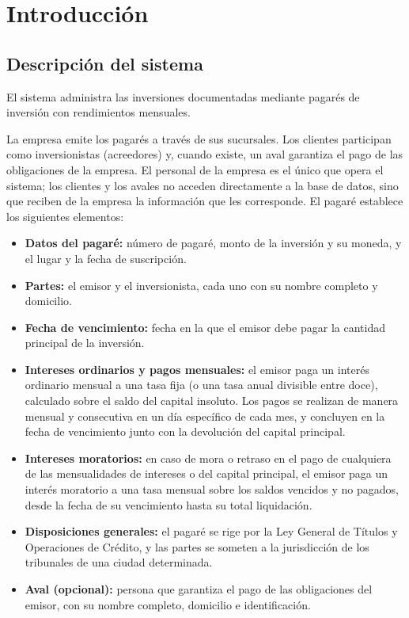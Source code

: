 \chapter{Introducci\'on}
\label{cap:introduccion}

\section{Descripci\'on del sistema}

El sistema administra las inversiones documentadas mediante pagar\'es de inversi\'on con rendimientos mensuales.

La empresa emite los pagar\'es a trav\'es de sus sucursales. Los clientes participan como inversionistas (acreedores) y, cuando existe, un aval garantiza el pago de las obligaciones de la empresa. El personal de la empresa es el \'unico que opera el sistema; los clientes y los avales no acceden directamente a la base de datos, sino que reciben de la empresa la informaci\'on que les corresponde. El pagar\'e establece los siguientes elementos:

\begin{itemize}[leftmargin=*]
	\item \textbf{Datos del pagar\'e:} n\'umero de pagar\'e, monto de la inversi\'on y su moneda, y el lugar y la fecha de suscripci\'on.
	\item \textbf{Partes:} el emisor y el inversionista, cada uno con su nombre completo y domicilio.
	\item \textbf{Fecha de vencimiento:} fecha en la que el emisor debe pagar la cantidad principal de la inversi\'on.
	\item \textbf{Intereses ordinarios y pagos mensuales:} el emisor paga un inter\'es ordinario mensual a una tasa fija (o una tasa anual divisible entre doce), calculado sobre el saldo del capital insoluto. Los pagos se realizan de manera mensual y consecutiva en un d\'ia espec\'ifico de cada mes, y concluyen en la fecha de vencimiento junto con la devoluci\'on del capital principal.
	\item \textbf{Intereses moratorios:} en caso de mora o retraso en el pago de cualquiera de las mensualidades de intereses o del capital principal, el emisor paga un inter\'es moratorio a una tasa mensual sobre los saldos vencidos y no pagados, desde la fecha de su vencimiento hasta su total liquidaci\'on.
	\item \textbf{Disposiciones generales:} el pagar\'e se rige por la Ley General de T\'itulos y Operaciones de Cr\'edito, y las partes se someten a la jurisdicci\'on de los tribunales de una ciudad determinada.
	\item \textbf{Aval (opcional):} persona que garantiza el pago de las obligaciones del emisor, con su nombre completo, domicilio e identificaci\'on.
\end{itemize}


